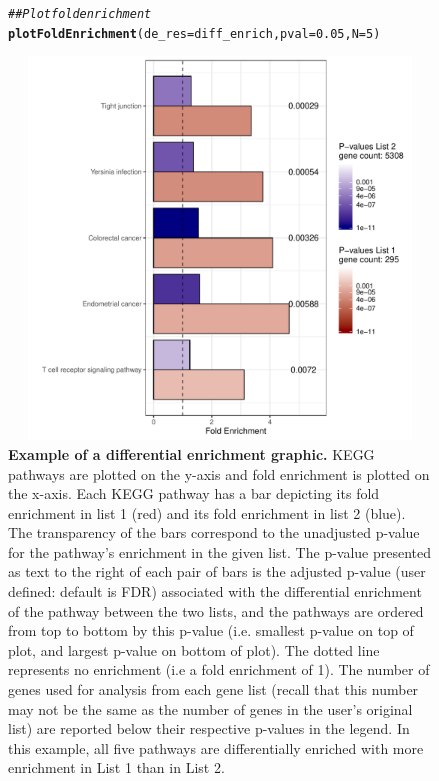 \documentclass[article]{jss}\usepackage[]{graphicx}\usepackage[]{color}
\makeatletter
\newcommand{\hlnum}[1]{\textcolor[rgb]{0.686,0.059,0.569}{#1}}%
\newcommand{\hlcom}[1]{\textcolor[rgb]{0.678,0.584,0.686}{\textit{#1}}}%
\newcommand{\hlstd}[1]{\textcolor[rgb]{0.345,0.345,0.345}{#1}}%
\newcommand{\hlkwc}[1]{\textcolor[rgb]{0.333,0.667,0.333}{#1}}%
\newcommand{\hlkwd}[1]{\textcolor[rgb]{0.737,0.353,0.396}{\textbf{#1}}}%
\newenvironment{kframe}{%
 \def\at@end@of@kframe{}%
 \ifinner\ifhmode%
  \def\at@end@of@kframe{\end{minipage}}%
  \begin{minipage}{\columnwidth}%
 \fi\fi%
 \def\FrameCommand##1{\hskip\@totalleftmargin \hskip-\fboxsep
 \colorbox{shadecolor}{##1}\hskip-\fboxsep
     \hskip-\linewidth \hskip-\@totalleftmargin \hskip\columnwidth}%
 \MakeFramed {\advance\hsize-\width
   \@totalleftmargin\z@ \linewidth\hsize
   \@setminipage}}%
 {\par\unskip\endMakeFramed%
 \at@end@of@kframe}
\newenvironment{knitrout}{}{} %
\makeatother
\begin{document}
\begin{figure}[H]
\begin{knitrout}
\color{fgcolor}\begin{kframe}
\begin{alltt}
\hlcom{## Plot fold enrichment}
\hlkwd{plotFoldEnrichment}\hlstd{(}\hlkwc{de_res} \hlstd{= diff_enrich,} \hlkwc{pval} \hlstd{=} \hlnum{0.05}\hlstd{,} \hlkwc{N} \hlstd{=} \hlnum{5}\hlstd{)}
\end{alltt}
\end{kframe}
\includegraphics[width=5.0in,height=4in]{figure/visualization_2-1} 

\end{knitrout}
\caption{\label{fig:barchart} \textbf{Example of a differential enrichment graphic.}
KEGG pathways are plotted on the y-axis and fold enrichment is
plotted on the x-axis. Each KEGG pathway has a bar depicting its
fold enrichment in list 1 (red) and its fold enrichment in list 2
(blue). The transparency of the bars correspond to the unadjusted
p-value for the pathway's enrichment in the given list. The p-value
presented as text to the right of each pair of bars is the adjusted
p-value (user defined: default is FDR) associated with the
differential enrichment of the pathway between the two lists, and
the pathways are ordered from top to bottom by this p-value (i.e.
smallest p-value on top of plot, and largest p-value on bottom of
plot). The dotted line represents no enrichment (i.e a fold enrichment of 1).
The number of genes used for analysis from each gene list (recall
that this number may not be the same as the number of genes in
the user’s original list) are reported below their respective
p-values in the legend. In this example, all five pathways are
differentially enriched with more enrichment in List 1 than in
List 2.}
\end{figure}
\end{document}
